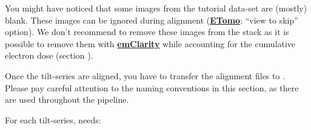 \begin{tip}You might have noticed that some images from the tutorial data-set are (mostly) blank. These images can be ignored during alignment (\href{https://bio3d.colorado.edu/imod/doc/etomoTutorial.html}{\textbf{ETomo}}: ``view to skip'' option). We don't recommend to remove these images from the stack as it is possible to remove them with \href{https://github.com/bHimes/emClarity}{\textbf{emClarity}} while accounting for the cumulative electron dose (section ).
\end{tip}


Once the tilt-series are aligned, you have to transfer the alignment files to {\emClarity}. Please pay careful attention to the naming conventions in this section, as there are used throughout the pipeline.

For each tilt-series, {\emClarity} needs:

